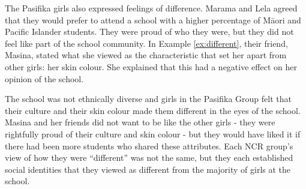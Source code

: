 The Pasifika girls also expressed feelings of difference.  Marama and Lela agreed that they would prefer to attend a school with a higher percentage of M\=aori and Pacific Islander students. They were proud of who they were, but they did not feel like part of the school community.  In Example \ref{ex:different}, their friend, Masina, stated what she viewed as the characteristic that set her apart from other girls: her skin colour.  She explained that this had a negative effect on her opinion of the school.

\label{ex:different}

\vspace{5 mm}

\noindent The school was not ethnically diverse and girls in the Pasifika Group felt that their culture and their skin colour made them different in the eyes of the school.  Masina and her friends did not want to be like the other girls - they were rightfully proud of their culture and skin colour - but they would have liked it if there had been more students who shared these attributes.  Each NCR group's view of how they were ``different'' was not the same, but they each established social identities that they viewed as different from the majority of girls at the school.


